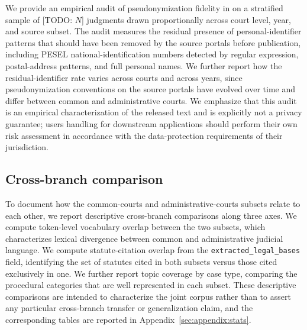 We provide an empirical audit of pseudonymization fidelity in \juddgespl{} on a stratified sample of [TODO: $N$] judgments drawn proportionally across court level, year, and source subset. The audit measures the residual presence of personal-identifier patterns that should have been removed by the source portals before publication, including PESEL national-identification numbers detected by regular expression, postal-address patterns, and full personal names. We further report how the residual-identifier rate varies across courts and across years, since pseudonymization conventions on the source portals have evolved over time and differ between common and administrative courts. We emphasize that this audit is an empirical characterization of the released text and is explicitly not a privacy guarantee; users handling \juddgespl{} for downstream applications should perform their own risk assessment in accordance with the data-protection requirements of their jurisdiction.

\subsection{Cross-branch comparison}
\label{sec:characterization:cross-branch}

To document how the common-courts and administrative-courts subsets relate to each other, we report descriptive cross-branch comparisons along three axes. We compute token-level vocabulary overlap between the two subsets, which characterizes lexical divergence between common and administrative judicial language. We compute statute-citation overlap from the \texttt{extracted\_legal\_bases} field, identifying the set of statutes cited in both subsets versus those cited exclusively in one. We further report topic coverage by case type, comparing the procedural categories that are well represented in each subset. These descriptive comparisons are intended to characterize the joint corpus rather than to assert any particular cross-branch transfer or generalization claim, and the corresponding tables are reported in Appendix~\ref{sec:appendix:stats}.
